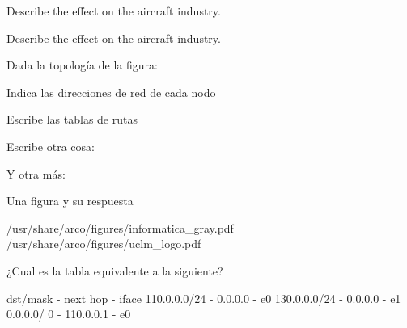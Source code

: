 \documentclass[english]{arco-exam}
\begin{document}
\begin{questions}
\begin{multiQuestion}[12]
\begin{parts}

    \subQuestion[]
      Describe the effect on the aircraft industry.


    \subQuestion[]
      Describe the effect on the aircraft industry.


    \end{parts}
  \end{multiQuestion}

  \begin{multiQuestion}[4]
    Dada la topología de la figura:

    \begin{parts}
      \subQuestion
      Indica las direcciones de red de cada nodo


      \subQuestion[1]
      Escribe las tablas de rutas


      \subQuestion
      Escribe otra cosa:


      \subQuestion
      Y otra más:

    \end{parts}

  \end{multiQuestion}


\begin{simpleQuestion}[5]
  Una figura y su respuesta

                     {/usr/share/arco/figures/informatica_gray.pdf}
                     {/usr/share/arco/figures/uclm_logo.pdf}
\end{simpleQuestion}


\begin{simpleQuestion}[8]
  ¿Cual es la tabla equivalente a la siguiente?

  \begin{listing}[style=pre]
  dst/mask     - next hop  - iface
  110.0.0.0/24 -   0.0.0.0 - e0
  130.0.0.0/24 -   0.0.0.0 - e1
  0.0.0.0/ 0   - 110.0.0.1 - e0
  \end{listing}


\end{simpleQuestion}
\end{questions}
\end{document}
